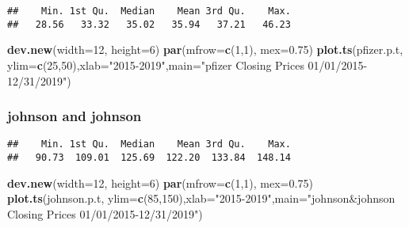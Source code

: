 \documentclass[]{article}
\newenvironment{Shaded}{\begin{snugshade}}{\end{snugshade}}
\newcommand{\KeywordTok}[1]{\textcolor[rgb]{0.13,0.29,0.53}{\textbf{#1}}}
\newcommand{\DataTypeTok}[1]{\textcolor[rgb]{0.13,0.29,0.53}{#1}}
\newcommand{\DecValTok}[1]{\textcolor[rgb]{0.00,0.00,0.81}{#1}}
\newcommand{\FloatTok}[1]{\textcolor[rgb]{0.00,0.00,0.81}{#1}}
\newcommand{\StringTok}[1]{\textcolor[rgb]{0.31,0.60,0.02}{#1}}
\newcommand{\OperatorTok}[1]{\textcolor[rgb]{0.81,0.36,0.00}{\textbf{#1}}}
\newcommand{\NormalTok}[1]{#1}
\begin{document}
\begin{verbatim}
##    Min. 1st Qu.  Median    Mean 3rd Qu.    Max. 
##   28.56   33.32   35.02   35.94   37.21   46.23
\end{verbatim}

\begin{Shaded}
\begin{Highlighting}[]
\KeywordTok{dev.new}\NormalTok{(}\DataTypeTok{width=}\DecValTok{12}\NormalTok{, }\DataTypeTok{height=}\DecValTok{6}\NormalTok{)}
\KeywordTok{par}\NormalTok{(}\DataTypeTok{mfrow=}\KeywordTok{c}\NormalTok{(}\DecValTok{1}\NormalTok{,}\DecValTok{1}\NormalTok{), }\DataTypeTok{mex=}\FloatTok{0.75}\NormalTok{)}
\KeywordTok{plot.ts}\NormalTok{(pfizer.p.t, }\DataTypeTok{ylim=}\KeywordTok{c}\NormalTok{(}\DecValTok{25}\NormalTok{,}\DecValTok{50}\NormalTok{),}\DataTypeTok{xlab=}\StringTok{"2015-2019"}\NormalTok{,}\DataTypeTok{main=}\StringTok{"pfizer Closing Prices 01/01/2015-12/31/2019"}\NormalTok{)}
\end{Highlighting}
\end{Shaded}

\subsubsection{johnson and johnson}\label{johnson-and-johnson}

\begin{Shaded}
\end{Shaded}

\begin{verbatim}
##    Min. 1st Qu.  Median    Mean 3rd Qu.    Max. 
##   90.73  109.01  125.69  122.20  133.84  148.14
\end{verbatim}

\begin{Shaded}
\begin{Highlighting}[]
\KeywordTok{dev.new}\NormalTok{(}\DataTypeTok{width=}\DecValTok{12}\NormalTok{, }\DataTypeTok{height=}\DecValTok{6}\NormalTok{)}
\KeywordTok{par}\NormalTok{(}\DataTypeTok{mfrow=}\KeywordTok{c}\NormalTok{(}\DecValTok{1}\NormalTok{,}\DecValTok{1}\NormalTok{), }\DataTypeTok{mex=}\FloatTok{0.75}\NormalTok{)}
\KeywordTok{plot.ts}\NormalTok{(johnson.p.t, }\DataTypeTok{ylim=}\KeywordTok{c}\NormalTok{(}\DecValTok{85}\NormalTok{,}\DecValTok{150}\NormalTok{),}\DataTypeTok{xlab=}\StringTok{"2015-2019"}\NormalTok{,}\DataTypeTok{main=}\StringTok{"johnson&johnson Closing Prices 01/01/2015-12/31/2019"}\NormalTok{)}
\end{Highlighting}
\end{Shaded}
\end{document}
